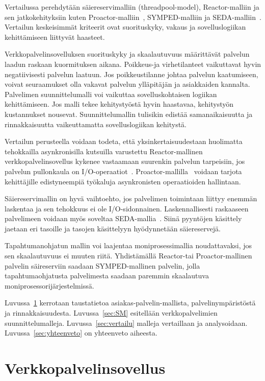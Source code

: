 \documentclass[finnish]{tktltiki2}%
\theoremstyle{definition}
\theoremstyle{remark}
\begin{document}
Vertailussa perehdytään säiereservimalliin (threadpool-model), Reactor-malliin\cite{schmidt_reactor:_1995} ja sen jatkokehityksiin
kuten Proactor-malliin~\cite{hu_applying_1998}, SYMPED-malliin ja SEDA-malliin~\cite{welsh_seda_2001}.
Vertailun keskeisimmät kriteerit ovat suorituskyky, vakaus ja
sovelluslogiikan kehittämiseen liittyvät haasteet.

Verkkopalvelinsovelluksen suorituskyky ja skaalautuvuus
määrittävät palvelun laadun raskaan kuormituksen aikana.
Poikkeus-ja virhetilanteet vaikuttavat hyvin negatiivisesti
palvelun laatuun. Jos poikkeustilanne johtaa
palvelun kaatumiseen, voivat seuraamukset olla vakavat
palvelun ylläpitäjän ja asiakkaiden kannalta.
Palvelimen suunnittelumalli voi vaikuttaa 
sovelluskohtaisen logiikan kehittämiseen.
Jos malli tekee kehitystyöstä hyvin haastavaa,
kehitystyön kustannukset nousevat.
Suunnittelumallin tulisikin edistää
samanaikaisuutta ja rinnakkaisuutta vaikeuttamatta
sovelluslogiikan kehitystä.

Vertailun perusteella voidaan todeta, että
yksinkertaisuudestaan huolimatta tehokkailla asynkronisilla
kutsuilla varustettu Reactor-mallinen verkkopalvelinsovellus
kykenee vastaamaan suurenkin palvelun tarpeisiin, jos palvelun
pullonkaula on I/O-operaatiot~\cite{schmidt_reactor:_1995}.
Proactor-mallilla~\cite{hu_applying_1998} voidaan tarjota kehittäjille edistyneempiä työkaluja
asynkronisten operaatioiden hallintaan.

Säiereservimallin on hyvä vaihtoehto, jos palvelimen
toimintaan liittyy enemmän laskentaa ja sen tehokkuus ei ole I/O-sidonnainen.
Laskennallisesti raskaaseen palvelimeen voidaan myös soveltaa SEDA-mallia~\cite{welsh_seda_2001}.
Siinä pyyntöjen käsittely jaetaan eri tasoille ja tasojen käsittelyyn
hyödynnetään säiereservejä.

Tapahtumanohjatun mallin voi laajentaa moniprosessimallia noudattavaksi,
jos sen skaalautuvuus ei muuten riitä.
Yhdistämällä Reactor-tai Proactor-mallinen palvelin säireserviin
saadaan SYMPED-mallinen palvelin, jolla tapahtumaohjatusta palvelimesta
saadaan paremmin skaalautuva moniprosessorijärjestelmissä.

Luvussa~\ref{vps} kerrotaan taustatietoa asiakas-palvelin-mallista, palvelinympäristöstä
ja rinnakkaisuudesta.
Luvussa~\ref{sec:SM} esitellään verkkopalvelimien suunnittelumalleja. Luvussa~\ref{sec:vertailu}
malleja vertaillaan ja analysoidaan. Luvussa~\ref{sec:yhteenveto} on yhteenveto aiheesta.

\section{Verkkopalvelinsovellus}\label{vps}
\end{document}
